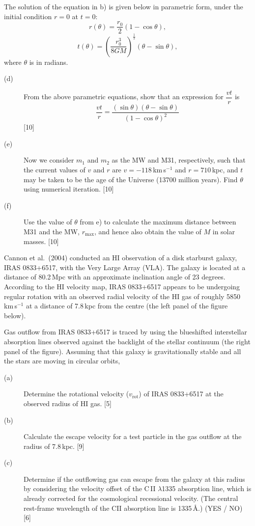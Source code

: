 The solution of the equation in b) is given below in parametric form, under
the initial condition $r = 0$ at $t = 0$:
\[ r(\theta) = \frac{r_0}{2}\left(1 - \cos\theta\right), \]
\[ t(\theta) = \left(\frac{r_0^3}{8GM}\right)^{\frac{1}{2}}
   \left(\theta - \sin\theta\right), \]
where $\theta$ is in radians.

\begin{description}
\item[(d)] From the above parametric equations, show that an expression for
  $\dfrac{vt}{r}$ is
  \[ \frac{vt}{r} = \frac{(\sin\theta)(\theta - \sin\theta)}
     {(1 - \cos\theta)^2} \]
  \hfill[10]
\item[(e)] Now we consider $m_1$ and $m_2$ as the MW and M31, respectively,
  such that the current values of $v$ and $r$ are $v = -118$\,km\,s$^{-1}$ and
  $r = 710$\,kpc, and $t$ may be taken to be the age of the Universe (13700
  million years). Find $\theta$ using numerical iteration. \hfill[10]
\item[(f)] Use the value of $\theta$ from e) to calculate the maximum distance
  between M31 and the MW, $r_{\max}$, and hence also obtain the value of $M$
  in solar masses. \hfill[10]
\end{description}

Cannon et al.\ (2004) conducted an HI observation of a disk starburst galaxy,
IRAS 0833+6517, with the Very Large Array (VLA). The galaxy is located at a
distance of 80.2\,Mpc with an approximate inclination angle of 23 degrees.
According to the HI velocity map, IRAS 0833+6517 appears to be undergoing
regular rotation with an observed radial velocity of the HI gas of roughly
5850\,km\,s$^{-1}$ at a distance of 7.8\,kpc from the centre (the left panel
of the figure below).

Gas outflow from IRAS 0833+6517 is traced by using the blueshifted
interstellar absorption lines observed against the backlight of the stellar
continuum (the right panel of the figure). Assuming that this galaxy is
gravitationally stable and all the stars are moving in circular orbits,

\begin{description}
\item[(a)] Determine the rotational velocity ($v_{\mathrm{rot}}$) of IRAS
  0833+6517 at the observed radius of HI gas. \hfill[5]
\item[(b)] Calculate the escape velocity for a test particle in the gas
  outflow at the radius of 7.8\,kpc. \hfill[9]
\item[(c)] Determine if the outflowing gas can escape from the galaxy at this
  radius by considering the velocity offset of the C\,II $\lambda$1335
  absorption line, which is already corrected for the cosmological recessional
  velocity. (The central rest-frame wavelength of the CII absorption line is
  1335\,\AA.) (YES / NO) \hfill[6]
\end{description}


